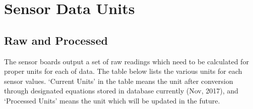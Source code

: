 \newpage
\section{Sensor Data Units}\label{section:parameterUnits}
\subsection { Raw and Processed} 


The sensor boards output a set of raw readings which need to be calculated for proper units for each of data.
The table below lists the various units for each sensor values.
`Current Units' in the table means the unit after conversion through designated equations stored in database currently (Nov, 2017), and `Processed Units' means the unit which will be updated in the future.

